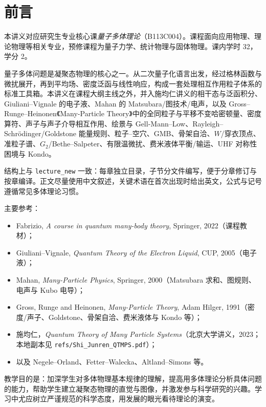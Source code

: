 \chapter*{前言}

本讲义对应研究生专业核心课\emph{量子多体理论}（B113C004）。课程面向应用物理、理论物理等相关专业，预修课程为量子力学、统计物理与固体物理。课内学时 32，学分 2。

量子多体问题是凝聚态物理的核心之一。从二次量子化语言出发，经过格林函数与微扰展开，再到平均场、密度泛函与线性响应，构成一套处理相互作用粒子体系的标准工具箱。本讲义在课程大纲主线之外，并入施均仁讲义的相干态与泛函积分、Giuliani--Vignale 的电子液、Mahan 的 Matsubara/图技术/电声，以及 Gross--Runge--Heinonen《Many-Particle Theory》中的全同粒子与平移不变哈密顿量、密度算符、声子与声子介导相互作用、绘景与 Gell-Mann--Low、Rayleigh--Schr\"odinger/Goldstone 能量规则、粒子--空穴、GMB、骨架自洽、$W$/穿衣顶点、准粒子谱、$G_2$/Bethe--Salpeter、有限温微扰、费米液体平衡/输运、UHF 对称性困境与 Kondo。

结构上与 \texttt{lecture\_new} 一致：每章独立目录，子节分文件编写，便于分章修订与按章编译。正文尽量使用中文叙述，关键术语在首次出现时给出英文，公式与记号遵循常见多体理论习惯。

主要参考：
\begin{itemize}
  \item Fabrizio, \textit{A course in quantum many-body theory}, Springer, 2022（课程教材）；
  \item Giuliani--Vignale, \textit{Quantum Theory of the Electron Liquid}, CUP, 2005（电子液）；
  \item Mahan, \textit{Many-Particle Physics}, Springer, 2000（Matsubara 求和、图规则、电声与 Kubo 电导）；
  \item Gross, Runge and Heinonen, \textit{Many-Particle Theory}, Adam Hilger, 1991（密度/声子、Goldstone、骨架自洽、费米液体与 Kondo 等）；
  \item 施均仁，\textit{Quantum Theory of Many Particle Systems}（北京大学讲义，2023；本地副本见 \texttt{refs/Shi\_Junren\_QTMPS.pdf}）；
  \item 以及 Negele--Orland、Fetter--Walecka、Altland--Simons 等。
\end{itemize}

教学目的是：加深学生对多体物理基本规律的理解，提高用多体理论分析具体问题的能力，帮助学生建立凝聚态物理的直觉与图像，并激发参与科学研究的兴趣。学习中尤应树立严谨规范的科学态度，用发展的眼光看待理论的演变。

